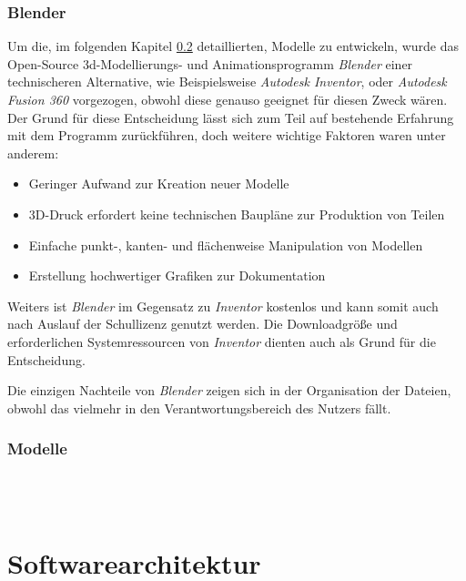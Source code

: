 \documentclass[paper=a4,12pt]{scrreprt}
\begin{document}
\subsection{Blender}
\label{ssec:Blender}
Um die, im folgenden Kapitel \ref{ssec:Models} detaillierten, Modelle zu entwickeln, wurde das Open-Source
3d-Modellierungs- und Animationsprogramm \textit{Blender}\cite{blender} einer technischeren Alternative, wie Beispielsweise
\textit{Autodesk Inventor}\cite{inventor}, oder \textit{Autodesk Fusion 360}\cite{fusion} vorgezogen, obwohl diese genauso geeignet für diesen Zweck wären.
Der Grund für diese Entscheidung lässt sich zum Teil auf bestehende Erfahrung mit dem Programm zurückführen,
doch weitere wichtige Faktoren waren unter anderem:
\begin{itemize}
  \item Geringer Aufwand zur Kreation neuer Modelle
  \item 3D-Druck erfordert keine technischen Baupläne zur Produktion von Teilen
  \item Einfache punkt-, kanten- und flächenweise Manipulation von Modellen
  \item Erstellung hochwertiger Grafiken zur Dokumentation
\end{itemize}
Weiters ist \textit{Blender} im Gegensatz zu \textit{Inventor} kostenlos und kann somit auch nach Auslauf der Schullizenz
genutzt werden. Die Downloadgröße und erforderlichen Systemressourcen von \textit{Inventor} dienten auch als Grund für die Entscheidung.

Die einzigen Nachteile von \textit{Blender} zeigen sich in der Organisation der Dateien, obwohl das vielmehr
in den Verantwortungsbereich des Nutzers fällt.
\pagebreak
\subsection{Modelle}
\label{ssec:Models}


\\\\

\pagebreak



\chapter{Softwarearchitektur}
\label{chap:software_arch}
\end{document}
